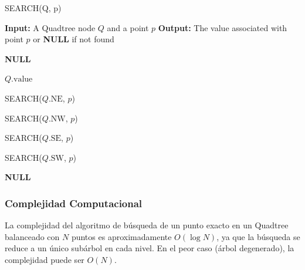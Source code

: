 \documentclass[9pt,a4paper,twoside]{rho-class/rho}
\begin{document}
            \begin{algorithm}
                \caption{SEARCH(Q, p)}
                \begin{algorithmic}[1]
                \Statex \textbf{Input:} A Quadtree node $Q$ and a point $p$
                \Statex \textbf{Output:} The value associated with point $p$ or \textbf{NULL} if not found
                
                    \State \Return \textbf{NULL} 
                \EndIf
                
                    \State \Return $Q.\text{value}$ 
                \EndIf
                
                    \State \Return SEARCH($Q.\text{NE}$, $p$)
                \EndIf
                
                    \State \Return SEARCH($Q.\text{NW}$, $p$)
                \EndIf
                
                    \State \Return SEARCH($Q.\text{SE}$, $p$)
                \EndIf
                
                    \State \Return SEARCH($Q.\text{SW}$, $p$)
                \EndIf
                
                \State \Return \textbf{NULL} 
                
                \end{algorithmic}
            \end{algorithm}
            \subsubsection{Complejidad Computacional}
                La complejidad del algoritmo de búsqueda de un punto exacto en un Quadtree balanceado con $N$ puntos es aproximadamente $O(\log N)$, ya que la búsqueda se reduce a un único subárbol en cada nivel. En el peor caso (árbol degenerado), la complejidad puede ser $O(N)$.
\end{document}

